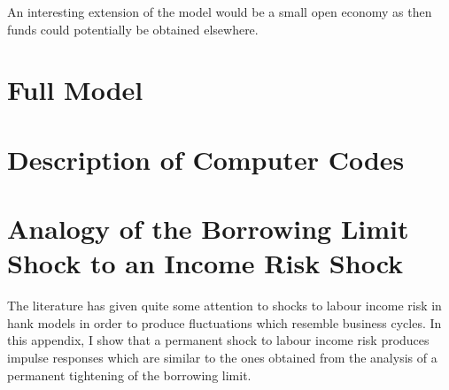 \documentclass[12pt]{article} %
\numberwithin{equation}{section} %
\begin{document}
An interesting extension of the model would be a small open economy as then funds could potentially be obtained elsewhere.

\newpage
\thispagestyle{plain}
\printbibliography[heading=bibintoc] %

\newpage
\thispagestyle{plain}
\renewcommand*{\thepage}{A-\arabic{page}} %
\begin{appendices}
\section{Full Model}
\label{sec-app:full}

\newpage
\thispagestyle{plain}
\section{Description of Computer Codes}
\label{sec-app:codes}

\newpage
\thispagestyle{plain}
\section{Analogy of the Borrowing Limit Shock to an Income Risk Shock}
\label{sec-app:income}
The literature has given quite some attention to shocks to labour income risk in \Gls{hank} models in order to produce fluctuations which resemble business cycles. In this appendix, I show that a permanent shock to labour income risk produces impulse responses which are similar to the ones obtained from the analysis of a permanent tightening of the borrowing limit.

\end{appendices}
\end{document}
